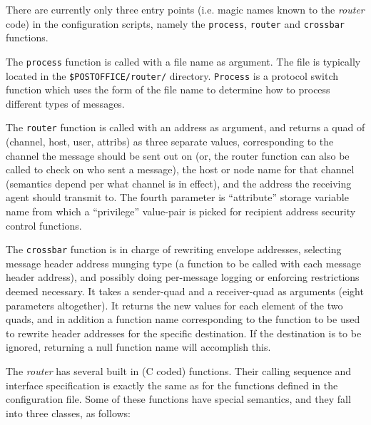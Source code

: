 There are currently only three entry points (i.e. magic names known to the
{\em router} code) in the configuration scripts, namely the {\tt process}, {\tt router} and 
{\tt crossbar} functions.

The {\tt process} function is called with a file name as argument. 
The file is typically located in the {\tt \$POSTOFFICE/router/} 
directory. {\tt Process} is a protocol switch function which uses the 
form of the file name to determine how to process different types of 
messages.

The {\tt router} function is called with an address as argument,
and returns a quad of (channel, host, user, attribs) as three
separate values,  corresponding to the channel the message should
be sent out on (or, the router function can also be called to check
on who sent a message), the host or node name for that channel
(semantics depend per what channel is in effect), and the address
the receiving agent should transmit to.
The fourth parameter is ``attribute'' storage variable name from
which a ``privilege'' value-pair is picked for recipient address
security control functions.

The {\tt crossbar} function is in charge of rewriting envelope addresses,
selecting message header address munging type (a function to be called with
each message header address), and possibly doing per-message logging or
enforcing restrictions deemed necessary.
It takes a sender-quad and a receiver-quad as arguments (eight parameters
altogether).
It returns the new values for each element of the two quads, and in addition
a function name corresponding to the function to be used to rewrite header
addresses for the specific destination.
If the destination is to be ignored, returning a null function name will
accomplish this.

The {\em router} has several built in (C coded) functions.
Their calling sequence and interface specification is exactly the same
as for the functions defined in the configuration file.
Some of these functions have special semantics, and they fall into three
classes, as follows:

